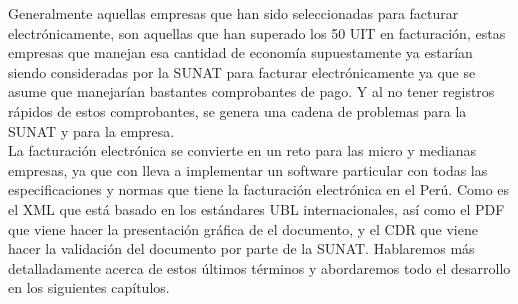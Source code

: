 Generalmente aquellas empresas que han sido seleccionadas para facturar electrónicamente, son aquellas que han superado los 50 UIT en facturación, estas empresas que manejan esa cantidad de economía supuestamente ya estarían siendo consideradas por la SUNAT para facturar electrónicamente ya que se asume que manejarían bastantes comprobantes de pago. Y al no tener registros rápidos de estos comprobantes, se genera una cadena de problemas para la SUNAT y para la empresa.\\

La facturación electrónica se convierte en un reto para las micro y medianas empresas, ya que con lleva a implementar un software particular con todas las especificaciones y normas que tiene la facturación electrónica en el Perú. Como es el XML que está basado en los estándares UBL internacionales, así como el PDF que viene hacer la presentación gráfica de el documento, y el CDR que viene hacer la validación del documento por parte de la SUNAT. Hablaremos más detalladamente acerca de estos últimos términos y abordaremos todo el desarrollo en los siguientes capítulos.
